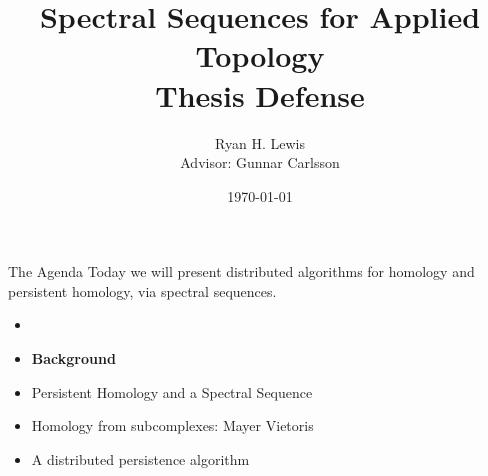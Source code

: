 \documentclass{beamer}
\title{Spectral Sequences for Applied Topology \\ Thesis Defense}
\author{Ryan H. Lewis \vspace{.5cm} \\ Advisor:  Gunnar Carlsson}
\date{\today}
\begin{document}
\frame{\titlepage}
\begin{frame}{The Agenda}
Today we will present distributed algorithms for homology and persistent homology, via spectral sequences.
\begin{minipage}{.65\textwidth}
\begin{itemize}
\item {\color{gray}{Motivation}}
\item \textbf{Background}
\item Persistent Homology and a Spectral Sequence
\item Homology from subcomplexes: Mayer Vietoris 
\item A distributed persistence algorithm
\end{itemize}
\end{minipage}
\end{frame}


%
%
%

\end{document}

